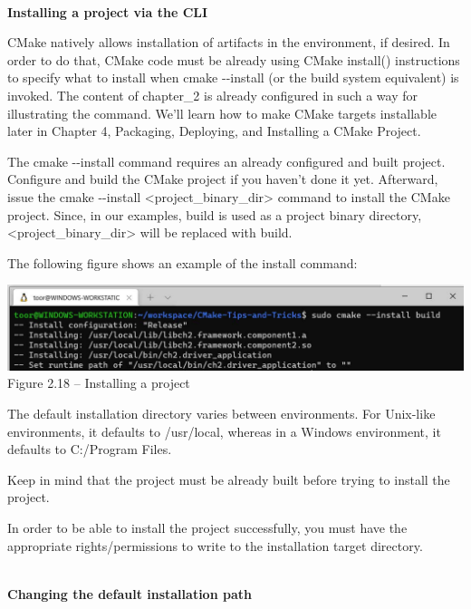 \hspace*{\fill} \\ %
\noindent
\textbf{Installing a project via the CLI}

CMake natively allows installation of artifacts in the environment, if desired. In order to do that, CMake code must be already using CMake install() instructions to specify what to install when cmake -{}-install (or the build system equivalent) is invoked. The content of chapter\_2 is already configured in such a way for illustrating the command. We'll learn how to make CMake targets installable later in Chapter 4, Packaging, Deploying, and Installing a CMake Project.

The cmake -{}-install command requires an already configured and built project. Configure and build the CMake project if you haven't done it yet. Afterward, issue the cmake -{}-install <project\_binary\_dir> command to install the CMake project. Since, in our examples, build is used as a project binary directory, <project\_binary\_dir> will be replaced with build.

The following figure shows an example of the install command:

\begin{center}
\includegraphics[width=1.\textwidth]{content/1/chapter2/images/18.jpg}\\
Figure 2.18 – Installing a project
\end{center}

The default installation directory varies between environments. For Unix-like environments, it defaults to /usr/local, whereas in a Windows environment, it defaults to C:/Program Files.

\begin{tcolorbox}[colback=webgreen!5!white,colframe=webgreen!75!black,title=Tip]
Keep in mind that the project must be already built before trying to install the project.

In order to be able to install the project successfully, you must have the appropriate rights/permissions to write to the installation target directory.
\end{tcolorbox}

\hspace*{\fill} \\ %
\noindent
\textbf{Changing the default installation path}

